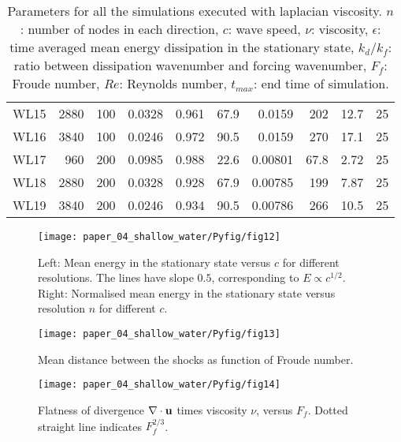 \begin{table}
\begin{center}
\begin{tabular}{lrrrrrrrrr}
WL15 &  2880 &  100 &   0.0328 &       0.961 &                    67.9 &  0.0159 &   202 &           12.7 &          25 \\
WL16 &  3840 &  100 &   0.0246 &       0.972 &                    90.5 &  0.0159 &   270 &           17.1 &          25 \\
WL17 &   960 &  200 &   0.0985 &       0.988 &                    22.6 & 0.00801 &  67.8 &           2.72 &          25 \\
WL18 &  2880 &  200 &   0.0328 &       0.928 &                    67.9 & 0.00785 &   199 &           7.87 &          25 \\
WL19 &  3840 &  200 &   0.0246 &       0.934 &                    90.5 & 0.00786 &   266 &           10.5 &          25 \\
\bottomrule
\end{tabular}


\label{Table2}



\caption{Parameters for all the simulations executed with laplacian viscosity.
$ n $: number of nodes in each direction, $ c $: wave speed, $ \nu  $:  viscosity, $ \epsilon $: time
averaged mean energy dissipation in the stationary state, $ k_{d}/ k_f $: ratio
between dissipation wavenumber and forcing wavenumber, $F_f $: Froude
number, $Re$: Reynolds number, $ t_{max} $: end time of simulation.}
\end{center}
\end{table}

\begin{figure}
\centerline{\texttt{[image: paper\_04\_shallow\_water/Pyfig/fig12]}}
\caption{Left: Mean energy in the stationary state versus $ c $ for different
resolutions. The lines have slope $ 0.5 $, corresponding to $ E \propto c^{1/2}
$. Right: Normalised mean energy in the stationary state versus resolution $ n
$ for different $ c $.}
\label{MeanE2}
\end{figure}

\begin{figure}
\centerline{\texttt{[image: paper\_04\_shallow\_water/Pyfig/fig13]}}
\caption{Mean distance between the shocks as function of Froude number.  }
\label{fig_distance_lap}
\end{figure}


\begin{figure}
\centerline{\texttt{[image: paper\_04\_shallow\_water/Pyfig/fig14]}}
\caption{Flatness of divergence $ \nabla \cdot {\bf u} $ times viscosity $ \nu $, versus $ F_f $. Dotted straight line indicates $ F_f^{2/3} $. }
\label{FlatnessDiv}
\end{figure}

